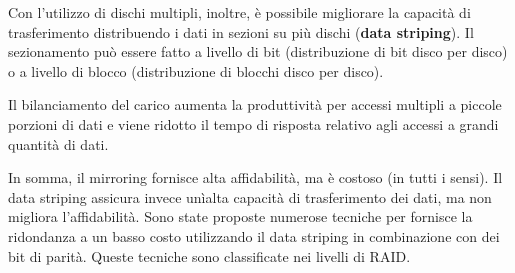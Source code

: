\documentclass[a4paper]{article}
\begin{document}
Con l'utilizzo di dischi multipli, inoltre, è possibile migliorare la capacità di trasferimento distribuendo i dati in sezioni su più dischi (\textbf{data striping}). Il sezionamento può essere fatto a livello di bit (distribuzione di bit disco per disco) o a livello di blocco (distribuzione di blocchi disco per disco).

Il bilanciamento del carico aumenta la produttività per accessi multipli a piccole porzioni di dati e viene ridotto il tempo di risposta relativo agli accessi a grandi quantità di dati.

In somma, il mirroring fornisce alta affidabilità, ma è costoso (in tutti i sensi). Il data striping assicura invece unìalta capacità di trasferimento dei dati, ma non migliora l'affidabilità. Sono state proposte numerose tecniche per fornisce la ridondanza a un basso costo utilizzando il data striping in combinazione con dei bit di parità. Queste tecniche sono classificate nei livelli di RAID.
\end{document}
